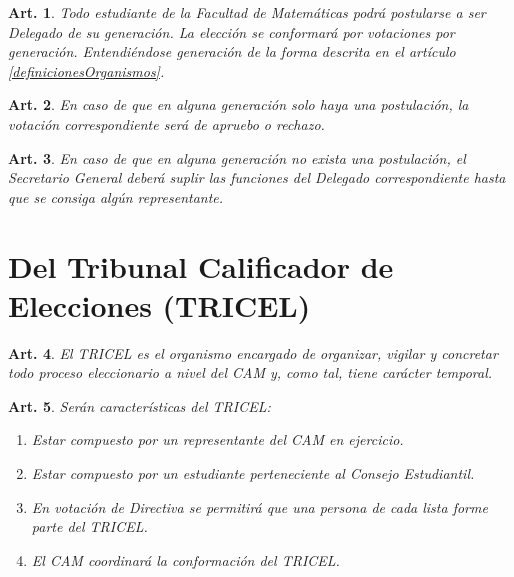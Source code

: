 \documentclass[letterpaper,11pt]{article}
\theoremstyle{plain}
\newtheorem{art}{Art.} %
\begin{document}
\begin{art}\label{eleccionesDelegadosCandidatos}
	Todo estudiante de la Facultad de Matemáticas podrá postularse a ser Delegado de su generación. La elección se conformará por votaciones por generación. Entendiéndose generación de la forma descrita en el artículo \ref{definicionesOrganismos}.%
\end{art}

\begin{art}\label{eleccionesDelegadosPostulacionUnica}
	En caso de que en alguna generación solo haya una postulación, la votación correspondiente será de apruebo o rechazo.
\end{art}

\begin{art}\label{eleccionesDelegadosFalla}
	En caso de que en alguna generación no exista una postulación, el Secretario General deberá suplir las funciones del Delegado correspondiente hasta que se consiga algún representante.
\end{art}

\section{Del Tribunal Calificador de Elecciones (TRICEL)}\label{TRICEL}
\begin{art}\label{TRICELMision}
	El TRICEL es el organismo encargado de organizar, vigilar y concretar todo proceso eleccionario a nivel del CAM y, como tal, tiene carácter temporal.
\end{art}

\begin{art}\label{TRICELDescripcion}
	Serán características del TRICEL:
	\begin{enumerate}
		\item Estar compuesto por un representante del CAM en ejercicio.
		\item Estar compuesto por un estudiante perteneciente al Consejo Estudiantil.
		\item En votación de Directiva se permitirá que una persona de cada lista forme parte del TRICEL.
		\item El CAM coordinará la conformación del TRICEL.
	\end{enumerate}
\end{art}
\end{document}
